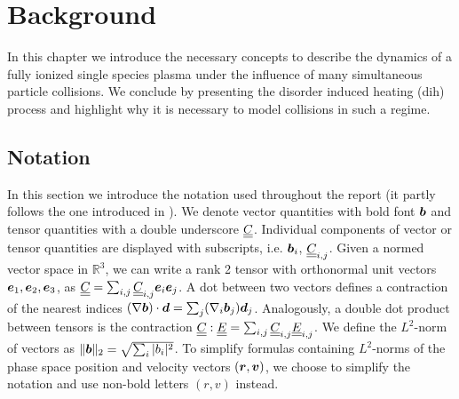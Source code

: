 \chapter{Background}
\label{chapter:background}

In this chapter we introduce the necessary concepts to describe the dynamics of a fully ionized
single species plasma under the influence of many simultaneous particle collisions.
We conclude by presenting the disorder induced heating (\gls{dih}) process and highlight why it is necessary to
model collisions in such a regime.

\section{Notation}

In this section we introduce the notation used throughout the report (it partly follows
the one introduced in \cite{thomas2012review}).
We denote vector quantities with bold font $\boldsymbol{b}$ and tensor quantities with a double underscore $\underline{\underline{C}}$.
Individual components of vector or tensor quantities are displayed with subscripts, i.e. $\boldsymbol{b}_i$,
$\underline{\underline{C}}_{i,j}$.
Given a normed vector space in $\mathbb R^3$, we can write a rank 2 tensor with orthonormal unit
vectors $\boldsymbol{e}_1, \boldsymbol{e}_2, \boldsymbol{e}_3$, as $\underline{\underline{C}} = \sum_{i,j} \underline{\underline{C}}_{i,j} \boldsymbol{e}_i \boldsymbol{e}_j$.
A dot between two vectors defines a contraction of the nearest indices $(\nabla \boldsymbol{b}) \cdot \boldsymbol{d} = \sum_j
(\nabla_i \boldsymbol{b}_j) \boldsymbol{d}_j$.
Analogously, a double dot product between tensors is the contraction $\underline{\underline{C}} : \underline{\underline{E}} = \sum_{i,j}
\underline{\underline{C}}_{i,j}
\underline{\underline{E}}_{i,j}$.
We define the $L^2$-norm of vectors as $\lVert \boldsymbol{b} \rVert_2 = \sqrt{\sum_i \vert b_i \vert^2}$.
To simplify formulas containing $L^2$-norms of the phase space position and velocity vectors
$(\boldsymbol{r}, \boldsymbol{v})$, we choose to simplify the notation and use non-bold letters $(r, v)$ instead.

